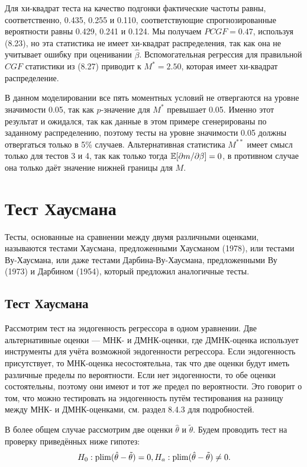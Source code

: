 Для хи-квадрат теста на качество подгонки фактические частоты равны, соответственно, 0.435, 0.255 и 0.110,  соответствующие спрогнозированные вероятности равны 0.429, 0.241 и 0.124. Мы получаем $PCGF = 0.47$, используя (8.23), но эта статистика не имеет хи-квадрат распределения, так как она не учитывает ошибку при оценивании $\hat{\beta}$. Вспомогательная регрессия для правильной $CGF$ статистики из (8.27) приводит к $M^* = 2.50$, которая имеет хи-квадрат распределение.

В данном моделировании все пять моментных условий не отвергаются на уровне значимости 0.05, так как $p$-значение для $M^*$ превышает 0.05. Именно этот результат и ожидался, так как данные в этом примере  сгенерированы по заданному распределению, поэтому тесты на уровне значимости 0.05 должны отвергаться только в 5\% случаев. Альтернативная статистика $M^{**}$ имеет смысл только для тестов 3 и 4, так как только тогда $\mathbb{E}[\partial{m}/\partial{\beta}] = 0$, в противном случае она только даёт значение нижней границы для $M$.

\section{Тест Хаусмана}

Тесты, основанные на сравнении между двумя различными оценками, называются тестами Хаусмана, предложенными Хаусманом (1978), или тестами Ву-Хаусмана, или даже тестами Дарбина-Ву-Хаусмана, предложенными Ву (1973) и Дарбином (1954), который предложил аналогичные тесты.

\subsection{Тест Хаусмана}

Рассмотрим тест на эндогенность регрессора в одном уравнении. Две альтернативные оценки --- МНК- и ДМНК-оценки, где ДМНК-оценка использует инструменты для учёта возможной эндогенности регрессора. Если эндогенность присутствует, то МНК-оценка несостоятельна, так что две оценки будут иметь различные пределы по вероятности. Если нет эндогенности, то обе оценки состоятельны, поэтому они имеют и тот же предел по вероятности. Это говорит о том, что можно тестировать на эндогенность путём тестирования на разницу между МНК- и ДМНК-оценками, см. раздел 8.4.3 для подробностей.

В более общем случае рассмотрим две оценки $\hat{\theta}$ и $\tilde{\theta}$. Будем проводить тест на проверку приведённых ниже гипотез:
\begin{equation}
H_0: \mathrm{plim }(\hat{\theta} - \tilde{\theta}) = 0,
H_a: \mathrm{plim }(\hat{\theta} - \tilde{\theta}) \not= 0.
\end{equation}

